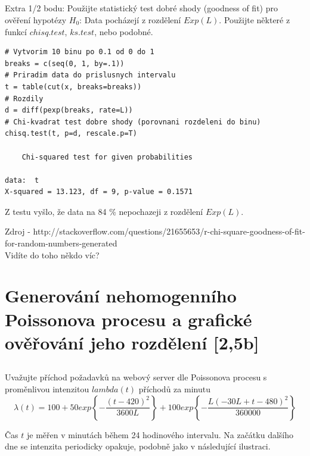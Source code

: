 \documentclass[a4paper]{article}
\begin{document}
\subsection{}
Extra 1/2 bodu: Použijte statistický test dobré shody (goodness of fit) pro ověření hypotézy $H_0$: Data pocházejí z rozdělení $Exp(L)$. Použijte některé z funkcí $chisq.test$, $ks.test$, nebo podobné.

\lstset{language = r, numbers=left, tabsize = 4, title=Řešení, basicstyle=\footnotesize}
\begin{lstlisting}[firstnumber=19]
# Vytvorim 10 binu po 0.1 od 0 do 1
breaks = c(seq(0, 1, by=.1))
# Priradim data do prislusnych intervalu
t = table(cut(x, breaks=breaks))
# Rozdily
d = diff(pexp(breaks, rate=L))
# Chi-kvadrat test dobre shody (porovnani rozdeleni do binu)
chisq.test(t, p=d, rescale.p=T)

	Chi-squared test for given probabilities

data:  t
X-squared = 13.123, df = 9, p-value = 0.1571
\end{lstlisting}
Z testu vyšlo, že data na 84 \% nepochazeji z rozdělení $Exp(L)$.


\vspace{1cm}
Zdroj - http://stackoverflow.com/questions/21655653/r-chi-square-goodness-of-fit-for-random-numbers-generated
\\
Vidíte do toho někdo víc?


\section{Generování nehomogenního Poissonova procesu a grafické ověřování jeho rozdělení [2,5b]}
\subsection{}
Uvažujte příchod požadavků na webový server dle Poissonova procesu s proměnlivou intenzitou $lambda(t)$ příchodů za minutu
$$
\lambda(t) = 100 + 50exp\left\{-\frac{(t - 420)^2}{3600L}\right\}+100exp\left\{-\frac{L(-30L + t - 480)^2}{360000}\right\}
$$

Čas $t$ je měřen v minutách během 24 hodinového intervalu. Na začátku dalšího dne se intenzita periodicky opakuje, podobně jako v následující ilustraci.

\end{document}
